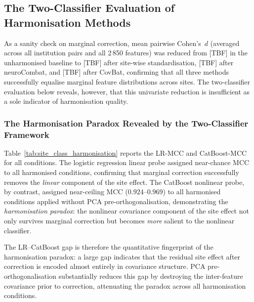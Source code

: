 \documentclass[preprint,12pt]{elsarticle}
\begin{document}
\subsection{The Two-Classifier Evaluation of Harmonisation Methods}
\label{subsec:harmonisation_results}

As a sanity check on marginal correction, mean pairwise Cohen's~$d$
(averaged across all institution pairs and all 2\,850 features)
was reduced from [TBF] in the unharmonised baseline to [TBF]
after site-wise standardisation, [TBF] after \mbox{neuroCombat},
and [TBF] after \mbox{CovBat}, confirming that all three methods
successfully equalise marginal feature distributions across sites.
The two-classifier evaluation below reveals, however, that this
univariate reduction is insufficient as a sole indicator of
harmonisation quality.


\subsubsection{The Harmonisation Paradox Revealed by the
  Two-Classifier Framework}
\label{subsubsec:paradox}

Table~\ref{tab:site_class_harmonisation} reports the LR-MCC and
CatBoost-MCC for all conditions.
The logistic regression linear probe assigned near-chance MCC to all
harmonised conditions, confirming that marginal correction
successfully removes the \emph{linear} component of the site effect.
The CatBoost nonlinear probe, by contrast, assigned near-ceiling MCC
($0.924$--$0.969$) to all harmonised conditions applied without PCA
pre-orthogonalisation, demonstrating the \emph{harmonisation paradox}:
the nonlinear covariance component of the site effect not only
survives marginal correction but becomes \emph{more} salient to the
nonlinear classifier.

The LR--CatBoost gap is therefore the quantitative fingerprint of
the harmonisation paradox: a large gap indicates that the residual
site effect after correction is encoded almost entirely in covariance
structure.
PCA pre-orthogonalisation substantially reduces this gap by
destroying the inter-feature covariance prior to correction,
attenuating the paradox across all harmonisation conditions.
\end{document}
